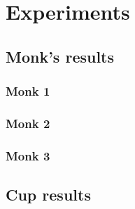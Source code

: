 \section{Experiments}

\subsection{Monk's results}

\subsubsection{Monk 1}

\subsubsection{Monk 2}

\subsubsection{Monk 3}

\subsection{Cup results}